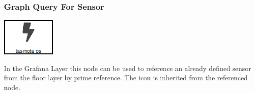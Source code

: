 \subsubsection{Graph Query For Sensor}
\noindent\begin{minipage}{0.15\textwidth}%
	\includegraphics[width=\linewidth]{assets/images/sensor}
\end{minipage}%
\hfill%
\begin{minipage}{0.8\textwidth}
	In the Grafana Layer this node can be used to reference an already defined sensor from the floor layer by prime reference. The icon is inherited from the referenced node.
\end{minipage}

